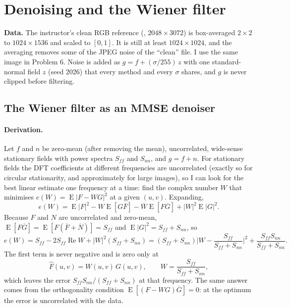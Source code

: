 \section{Denoising and the Wiener filter}

\textbf{Data.} The instructor's clean RGB reference (,
$2048\times3072$) is box-averaged $2\times2$ to $1024\times1536$ and scaled to
$[0,1]$. It is still at least $1024\times1024$, and the averaging removes some of
the JPEG noise of the ``clean'' file. I use the same image in Problem 6. Noise is
added as $g=f+(\sigma/255)\,z$ with one standard-normal field $z$ (seed 2026)
that every method and every $\sigma$ shares, and $g$ is never clipped before
filtering.

\subsection{The Wiener filter as an MMSE denoiser}

\paragraph{Derivation.} Let $f$ and $n$ be zero-mean (after removing the mean),
uncorrelated, wide-sense stationary fields with power spectra $S_{ff}$ and
$S_{nn}$, and $g=f+n$. For stationary fields the DFT coefficients at different
frequencies are uncorrelated (exactly so for circular stationarity, and
approximately for large images), so I can look for the best linear estimate one
frequency at a time: find the complex number $W$ that minimises
$e(W)=\operatorname{E}|F-WG|^2$ at a given $(u,v)$. Expanding,
\begin{equation}
e(W)=\operatorname{E}|F|^2-W\operatorname{E}[G\overline F]-\overline W\operatorname{E}[F\overline G]+|W|^2\operatorname{E}|G|^2 .
\end{equation}
Because $F$ and $N$ are uncorrelated and zero-mean,
$\operatorname{E}[F\overline G]=\operatorname{E}[F(\overline F+\overline N)]=S_{ff}$ and
$\operatorname{E}|G|^2=S_{ff}+S_{nn}$, so
\begin{equation}
e(W)=S_{ff}-2S_{ff}\operatorname{Re}W+|W|^2(S_{ff}+S_{nn})
=(S_{ff}+S_{nn})\Big|W-\frac{S_{ff}}{S_{ff}+S_{nn}}\Big|^2+\frac{S_{ff}S_{nn}}{S_{ff}+S_{nn}} .
\end{equation}
The first term is never negative and is zero only at
\begin{equation}
\hat F(u,v)=W(u,v)\,G(u,v),\qquad W=\frac{S_{ff}}{S_{ff}+S_{nn}},
\end{equation}
which leaves the error $S_{ff}S_{nn}/(S_{ff}+S_{nn})$ at that frequency. The
same answer comes from the orthogonality condition
$\operatorname{E}[(F-WG)\overline G]=0$: at the optimum the error is
uncorrelated with the data.

